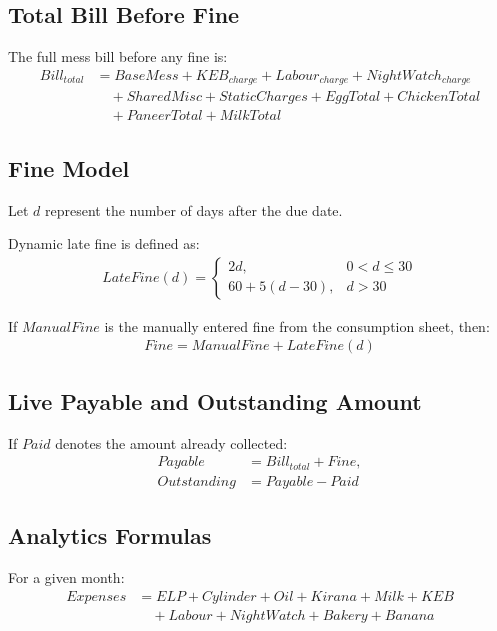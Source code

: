 \documentclass[conference]{IEEEtran}
\begin{document}
\subsection{Total Bill Before Fine}
The full mess bill before any fine is:
\begin{align}
Bill_{total} &= BaseMess + KEB_{charge} + Labour_{charge} + NightWatch_{charge} \nonumber \\
&\quad + SharedMisc + StaticCharges + EggTotal + ChickenTotal \nonumber \\
&\quad + PaneerTotal + MilkTotal
\end{align}

\subsection{Fine Model}
Let \(d\) represent the number of days after the due date.

Dynamic late fine is defined as:
\begin{align}
LateFine(d) =
\begin{cases}
2d, & 0 < d \leq 30 \\
60 + 5(d-30), & d > 30
\end{cases}
\end{align}

If \(ManualFine\) is the manually entered fine from the consumption sheet, then:
\begin{align}
Fine = ManualFine + LateFine(d)
\end{align}

\subsection{Live Payable and Outstanding Amount}
If \(Paid\) denotes the amount already collected:
\begin{align}
Payable &= Bill_{total} + Fine, \\
Outstanding &= Payable - Paid
\end{align}

\subsection{Analytics Formulas}
For a given month:
\begin{align}
Expenses &= ELP + Cylinder + Oil + Kirana + Milk + KEB \nonumber \\
&\quad + Labour + NightWatch + Bakery + Banana
\end{align}
\end{document}
